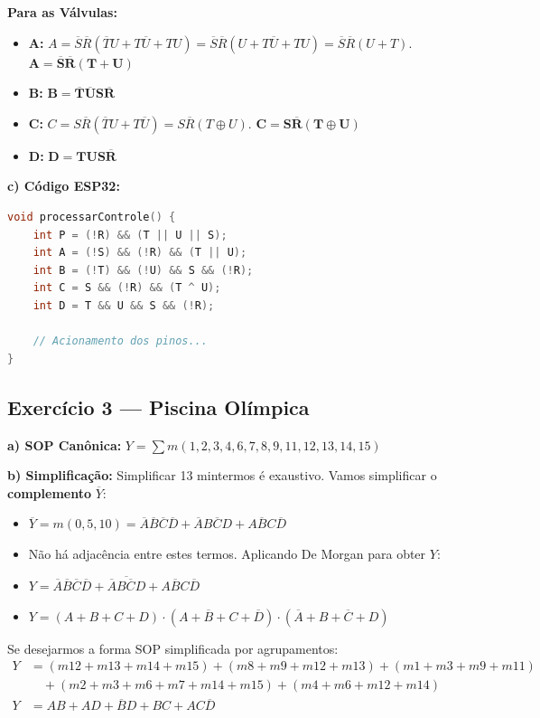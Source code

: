 \documentclass[12pt]{article}
\begin{document}
\begin{solucao}
\textbf{Para as Válvulas:}
\begin{itemize}
    \item \textbf{A:} $A = \overline{S}\overline{R}(\overline{T}U + T\overline{U} + TU) = \overline{S}\overline{R}(U + T\overline{U} + TU) = \overline{S}\overline{R}(U + T)$. $\mathbf{A = \overline{S}\overline{R}(T + U)}$
    \item \textbf{B:} $\mathbf{B = \overline{T}\overline{U}S\overline{R}}$
    \item \textbf{C:} $C = S\overline{R}(\overline{T}U + T\overline{U}) = S\overline{R}(T \oplus U)$. $\mathbf{C = S\overline{R}(T \oplus U)}$
    \item \textbf{D:} $\mathbf{D = TUS\overline{R}}$
\end{itemize}

\textbf{c) Código ESP32:}
\begin{lstlisting}[language=C++]
void processarControle() {
    int P = (!R) && (T || U || S);
    int A = (!S) && (!R) && (T || U);
    int B = (!T) && (!U) && S && (!R);
    int C = S && (!R) && (T ^ U);
    int D = T && U && S && (!R);
    
    // Acionamento dos pinos...
}
\end{lstlisting}
\end{solucao}

\subsection*{Exercício 3 — Piscina Olímpica}

\begin{solucao}
\textbf{a) SOP Canônica:}
$Y = \sum m(1, 2, 3, 4, 6, 7, 8, 9, 11, 12, 13, 14, 15)$

\textbf{b) Simplificação:}
Simplificar 13 mintermos é exaustivo. Vamos simplificar o \textbf{complemento} $\overline{Y}$:
\begin{itemize}
    \item $\overline{Y} = m(0, 5, 10) = \overline{A}\overline{B}\overline{C}\overline{D} + \overline{A}B\overline{C}D + A\overline{B}C\overline{D}$
    \item Não há adjacência entre estes termos. Aplicando De Morgan para obter $Y$:
    \item $Y = \overline{\overline{A}\overline{B}\overline{C}\overline{D} + \overline{A}B\overline{C}D + A\overline{B}C\overline{D}}$
    \item $Y = (A+B+C+D) \cdot (A+\overline{B}+C+\overline{D}) \cdot (\overline{A}+B+\overline{C}+D)$
\end{itemize}

Se desejarmos a forma SOP simplificada por agrupamentos:
\begin{align*}
    Y &= (m12+m13+m14+m15) + (m8+m9+m12+m13) + (m1+m3+m9+m11) \\
    &\quad + (m2+m3+m6+m7+m14+m15) + (m4+m6+m12+m14) \\
    Y &= AB + AD + \overline{B}D + BC + AC\overline{D}
\end{align*}
\end{solucao}
\end{document}
